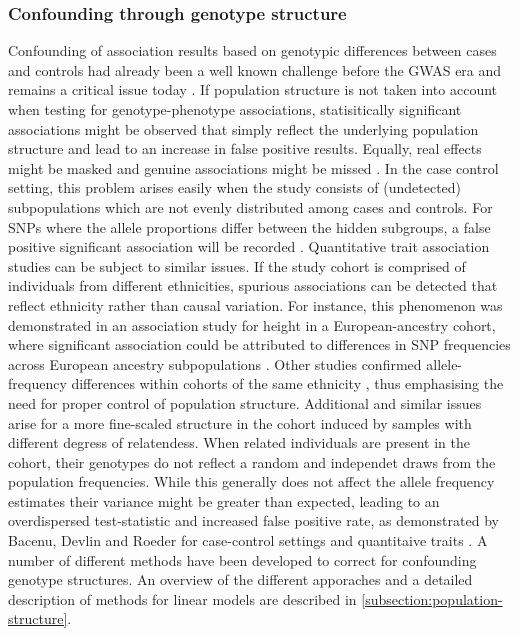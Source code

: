 \subsubsection{Confounding through genotype structure}
Confounding of association results based on genotypic differences between cases and controls had already been a well known challenge before the GWAS era \citep{Spielmann1993} and remains a critical issue today \citep{}. If population structure is not taken into account when testing for genotype-phenotype associations, statisitically significant associations might be observed that simply reflect the underlying population structure and lead to an increase in false positive results. Equally, real effects might be masked and genuine associations might be missed \citep{Marchini2004}. In the case control setting, this problem arises easily when the study consists of (undetected) subpopulations which are not evenly distributed among cases and controls. For SNPs where the allele proportions differ between the hidden subgroups, a false positive significant association will be recorded \citep{Marchini2004,Balding2006}. Quantitative trait association studies can be subject to similar issues. If the study cohort is comprised of individuals from different ethnicities, spurious associations can be detected that reflect ethnicity rather than causal variation. For instance, this phenomenon was demonstrated in an association study for height in a European-ancestry cohort, where significant association could be attributed to differences in SNP frequencies across European ancestry subpopulations \citep{Campbell2005}.  Other studies confirmed allele-frequency differences within cohorts of the same ethnicity \citep{Tian2008a,Tian2008b}, thus emphasising the need for proper control of population structure. Additional and similar issues arise for a more fine-scaled structure in the cohort induced by samples with different degress of relatendess. When related individuals are present in the cohort, their genotypes do not reflect a random and independet draws from the population frequencies. While this generally does not affect the allele frequency estimates their variance might be greater than expected, leading to an overdispersed test-statistic and increased false positive rate, as demonstrated by Bacenu, Devlin and Roeder for case-control settings and quantitaive traits \citep{Devlin1999, Bacanu2002}. 
A number of different methods have been developed to correct for confounding genotype structures. An overview of the different apporaches and a detailed description of methods for linear models are described in \cref{subsection:population-structure}.

